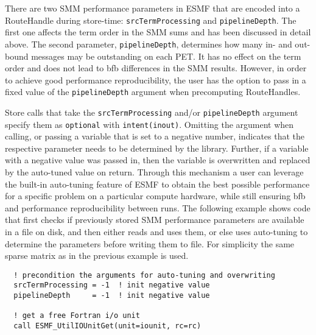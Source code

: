    There are two SMM performance parameters in ESMF that are encoded into a
   RouteHandle during store-time: {\tt srcTermProcessing} and
   {\tt pipelineDepth}. The first one affects the term order in the SMM sums and 
   has been discussed in detail above. The second parameter, {\tt pipelineDepth},
   determines how many in- and out-bound messages may be outstanding on each
   PET. It has no effect on the term order and does not lead to bfb differences
   in the SMM results. However, in order to achieve good performance
   reproducibility, the user has the option to pass in a fixed value of the
   {\tt pipelineDepth} argument when precomputing RouteHandles.
   
   Store calls that take the {\tt srcTermProcessing} and/or {\tt pipelineDepth}
   argument specify them as {\tt optional} with {\tt intent(inout)}. Omitting the
   argument when calling, or passing a variable that is set to a negative
   number, indicates that the respective parameter needs to be determined by
   the library. Further, if a variable with a negative value was passed in, then
   the variable is overwritten and replaced by the auto-tuned value on return. Through
   this mechanism a user can leverage the built-in auto-tuning feature of ESMF to
   obtain the best possible performance for a specific problem on a particular
   compute hardware, while still ensuring bfb and performance
   reproducibility between runs. The following example shows code that first
   checks if previously stored SMM performance parameters are available in a
   file on disk, and then either reads and uses them, or else uses auto-tuning
   to determine the parameters before writing them to file. For simplicity the
   same sparse matrix as in the previous example is used.
   

 \begin{verbatim}
  ! precondition the arguments for auto-tuning and overwriting
  srcTermProcessing = -1  ! init negative value
  pipelineDepth     = -1  ! init negative value

  ! get a free Fortran i/o unit
  call ESMF_UtilIOUnitGet(unit=iounit, rc=rc)
 
\end{verbatim}
 

